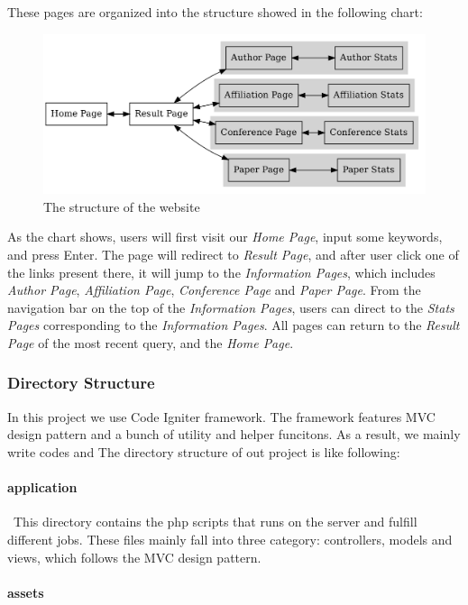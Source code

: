 \documentclass[a4paper, 10pt]{article}
\begin{document}
These pages are organized into the structure showed in the following chart:
\begin{figure}[H]
  \centering
  \includegraphics[width=\textwidth]{web_struct.png}
  \caption{The structure of the website}
  \label{fig:web_struct}
\end{figure}
As the chart shows, users will first visit our \textit{Home Page}, input some keywords, and press Enter. The page will redirect to \textit{Result Page}, and after user click one of the links present there, it will jump to the \textit{Information Pages}, which includes \textit{Author Page}, \textit{Affiliation Page}, \textit{Conference Page} and \textit{Paper Page}. From the navigation bar on the top of the \textit{Information Pages}, users can direct to the \textit{Stats Pages} corresponding to the \textit{Information Pages}. All pages can return to the \textit{Result Page} of the most recent query, and the \textit{Home Page}.

\subsubsection{Directory Structure}

In this project we use Code Igniter framework. The framework features MVC design pattern and a bunch of utility and helper funcitons. As a result, we mainly write codes and 
The directory structure of out project is like following:
\paragraph{application}\ 
This directory contains the php scripts that runs on the server and fulfill different jobs. These files mainly fall into three category: controllers, models and views, which follows the MVC design pattern.
\paragraph{assets}\
\end{document}
